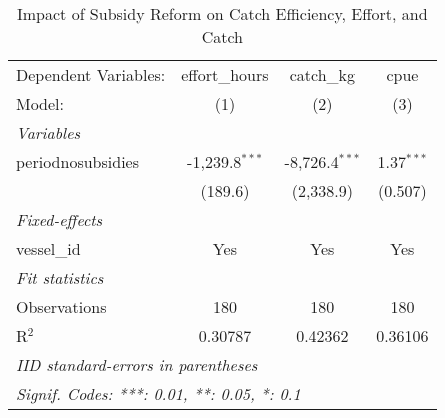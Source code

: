 
\begin{table}[htbp]
   \caption{\label{tab:cpue_regression} Impact of Subsidy Reform on Catch Efficiency, Effort, and Catch}
   \centering
   \begin{tabular}{lccc}
      \tabularnewline \midrule \midrule
      Dependent Variables: & effort\_hours    & catch\_kg        & cpue\\  
      Model:               & (1)              & (2)              & (3)\\  
      \midrule
      \emph{Variables}\\
      periodnosubsidies    & -1,239.8$^{***}$ & -8,726.4$^{***}$ & 1.37$^{***}$\\   
                           & (189.6)          & (2,338.9)        & (0.507)\\   
      \midrule
      \emph{Fixed-effects}\\
      vessel\_id           & Yes              & Yes              & Yes\\  
      \midrule
      \emph{Fit statistics}\\
      Observations         & 180              & 180              & 180\\  
      R$^2$                & 0.30787          & 0.42362          & 0.36106\\  
      \midrule \midrule
      \multicolumn{4}{l}{\emph{IID standard-errors in parentheses}}\\
      \multicolumn{4}{l}{\emph{Signif. Codes: ***: 0.01, **: 0.05, *: 0.1}}\\
   \end{tabular}
\end{table}


